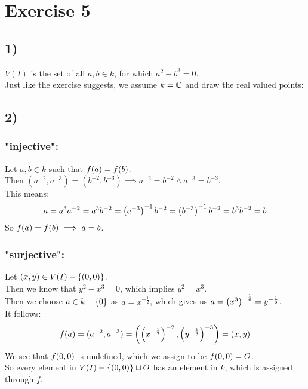 \documentclass[a4paper]{scrartcl}
\begin{document}
\section*{Exercise 5}
\subsection*{1)}
$V(I)$ is the set of all $a,b\in k$, for which $a^2-b^3=0$.\\
Just like the exercise suggests, we assume $k=\mathbb{C}$ and draw the real valued points:
\begin{center}
\end{center}
\subsection*{2)}
\subsubsection*{"injective":}
Let $a,b\in k$ such that $f{\left( a \right)}=f{\left( b \right)}$.\\
Then $(a^{-2},a^{-3})=(b^{-2},b^{-3})\implies a^{-2}=b^{-2}\wedge a^{-3}=b^{-3}$.\\
This means:
\[a=a^3a^{-2}=a^3b^{-2}=\left( a^{-3} \right)^{-1}b^{-2}=\left( b^{-3} \right)^{-1}b^{-2}=b^3b^{-2}=b\]
So $f{\left( a \right)}=f{\left( b \right)}\implies a=b$.
\subsubsection*{"surjective":}
Let $(x,y)\in V{\left( I \right)}-\left\lbrace (0,0) \right\rbrace$.\\
Then we know that $y^2-x^3=0$, which implies $y^2=x^3$.\\
Then we choose $a\in k-\left\lbrace 0 \right\rbrace$ as $a=x^{-\frac{1}{2}}$, which gives us $a=\left( x^3 \right)^{-\frac{1}{6}}=y^{-\frac{1}{3}}$.\\
It follows:
\[f{\left( a \right)}=(a^{-2},a^{-3})=\left( \left( x^{-\frac{1}{2}} \right)^{-2},\left( y^{-\frac{1}{3}} \right)^{-3} \right)=(x,y)\]
We see that $f{\left( 0,0 \right)}$ is undefined, which we assign to be $f{\left( 0,0 \right)}=O$.\\
So every element in $V{\left( I \right)}-\left\lbrace (0,0) \right\rbrace\sqcup O$ has an element in $k$, which is assigned through $f$.
\end{document}
